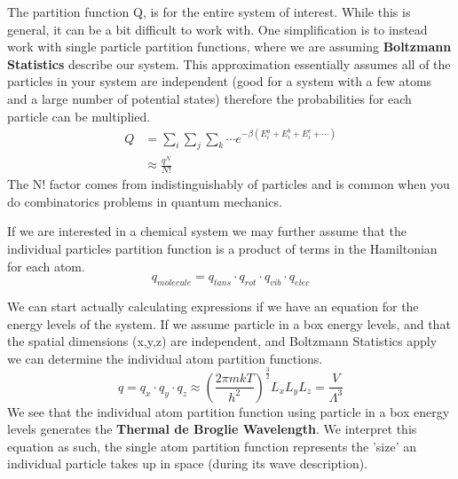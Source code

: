 \documentclass{article}
\begin{document}
The partition function Q, is for the entire system of interest. 
While this is general, it can be a bit difficult to work with.
One simplification is to instead work with single particle partition functions, where we are assuming \textbf{Boltzmann Statistics} describe our system. 
This approximation essentially assumes all of the particles in your system are independent (good for a system with a few atoms and a large number of potential states) therefore the probabilities for each particle can be multiplied. 
\begin{equation}
\begin{split}
    Q &= \sum_i \sum_j \sum_k \cdots  e^{-\beta (E_i^a + E_i^b + E_i^c + \cdots)} \\
    &\approx \frac{q^N}{N!}
\end{split}
\end{equation}
The N! factor comes from indistinguishably of particles and is common when you do combinatorics problems in quantum mechanics. 

If we are interested in a chemical system we may further assume that the individual particles partition function is a product of terms in the Hamiltonian for each atom. 
\begin{equation}
    q_{molecule} = q_{tans} \cdot q_{rot} \cdot q_{vib} \cdot q_{elec}
\end{equation}

We can start actually calculating expressions if we have an equation for the energy levels of the system. 
If we assume particle in a box energy levels, and that the spatial dimensions (x,y,z) are independent, and Boltzmann Statistics apply we can determine the individual atom partition functions. 
\begin{equation}
      q = q_x\cdot q_y \cdot q_z \approx \left (\frac{2\pi mkT}{h^2} \right )^{\frac{3}{2}} L_xL_yL_z = \frac{V}{\Lambda^3}
\end{equation}
We see that the individual atom partition function using particle in a box energy levels generates the \textbf{Thermal de Broglie Wavelength}. 
We interpret this equation as such, the single atom partition function represents the 'size' an individual particle takes up in space (during its wave description). 
\end{document}
